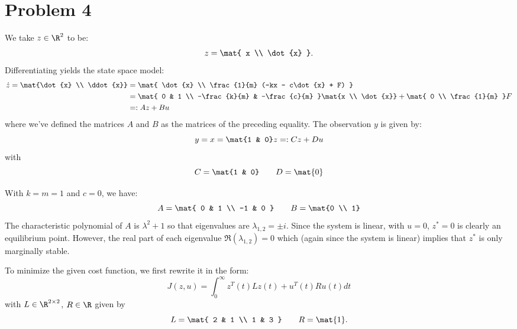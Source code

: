 \documentclass{homework}
\begin{document}
\section{Problem 4}
\begin{letterenum}
\item We take $z\in\R^2$ to be:
\begin{equation*}
    z = \mat{
        x \\ \dot{x}
    }.
\end{equation*}
Differentiating yields the state space model:
\begin{align*}
    \dot{z} = \mat{\dot{x} \\ \ddot{x}} &= \mat{
        \dot{x} \\
        \frac{1}{m} (-kx - c\dot{x} + F)
    } \\
    &= \mat{
        0 & 1 \\
        -\frac{k}{m} & -\frac{c}{m}
    } \mat{x \\ \dot{x}} + \mat{
        0 \\ \frac{1}{m}
    } F \\
    &=: Az + Bu
\end{align*}
where we've defined the matrices $A$ and $B$ as the matrices of
the preceding equality. The observation $y$ is given by:
\begin{equation*}
    y = x = \mat{1 & 0} z =: Cz + Du
\end{equation*}
with
\begin{equation*}
    C = \mat{1 & 0} \qquad D = \mat{0}
\end{equation*}

\item With $k=m=1$ and $c=0$, we have:
\begin{equation*}
    A = \mat{
        0 & 1 \\
        -1 & 0
    } \qquad B = \mat{0 \\ 1}
\end{equation*}
The characteristic polynomial of $A$ is $\lambda^2 + 1$ so that
eigenvalues are $\lambda_{1,2} = \pm i$. Since the system is linear,
with $u=0$, $z^*=0$ is clearly an equilibrium point. However, 
the real part of each eigenvalue $\Re(\lambda_{1,2}) = 0$ which
(again since the system is linear) implies that $z^*$ is only marginally stable.

\item To minimize the given cost function, we first rewrite it in the form:
\begin{equation}
    J(z, u) = \int_{0}^{\infty} z^T(t)Lz(t) + u^T(t)Ru(t) dt
    \label{eq:cost}
\end{equation}
with $L\in\R^{2\times 2}$, $R\in\R$ given by
\begin{equation*}
    L = \mat{
        2 & 1 \\
        1 & 3
    } \qquad R = \mat{1}.
\end{equation*}


\end{letterenum}
\end{document}
